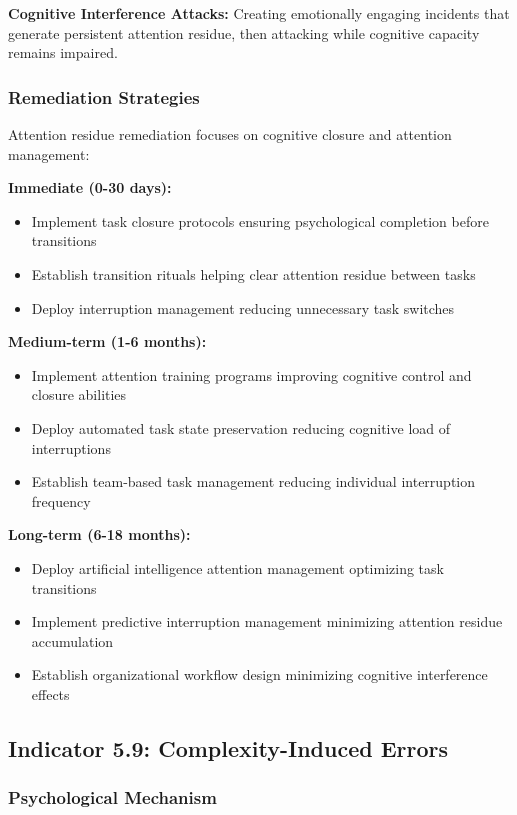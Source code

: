 \documentclass[11pt,a4paper]{article}
\begin{document}
\textbf{Cognitive Interference Attacks:} Creating emotionally engaging incidents that generate persistent attention residue, then attacking while cognitive capacity remains impaired.

\subsubsection{Remediation Strategies}

Attention residue remediation focuses on cognitive closure and attention management:

\textbf{Immediate (0-30 days):}
\begin{itemize}
\item Implement task closure protocols ensuring psychological completion before transitions
\item Establish transition rituals helping clear attention residue between tasks
\item Deploy interruption management reducing unnecessary task switches
\end{itemize}

\textbf{Medium-term (1-6 months):}
\begin{itemize}
\item Implement attention training programs improving cognitive control and closure abilities
\item Deploy automated task state preservation reducing cognitive load of interruptions
\item Establish team-based task management reducing individual interruption frequency
\end{itemize}

\textbf{Long-term (6-18 months):}
\begin{itemize}
\item Deploy artificial intelligence attention management optimizing task transitions
\item Implement predictive interruption management minimizing attention residue accumulation
\item Establish organizational workflow design minimizing cognitive interference effects
\end{itemize}

\subsection{Indicator 5.9: Complexity-Induced Errors}

\subsubsection{Psychological Mechanism}
\end{document}
